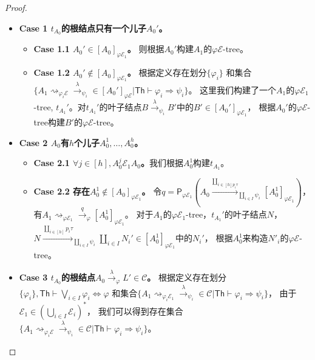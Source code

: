 \begin{proof}
\begin{itemize}
   \item {
      \textbf{Case 1 $t_{A_0}$的根结点只有一个儿子$A_0'$。}
      \begin{itemize}
         \item {
            \textbf{Case 1.1 $A_0'\in [A_0]_{\varphi\mathcal{E}_1}$。} 则根据$A_0'$构建$A_1$的$\varphi\mathcal{E}$-tree。
         }
         \item {
            \textbf{Case 1.2 $A_0'\notin [A_0]_{\varphi\mathcal{E}_1}$。} 
            根据定义存在划分$\{\varphi_i\}$
            和集合$\{A_1\rightsquigarrow_{\varphi_i\mathcal{E}}\stackrel{\lambda}{\rightarrow}_{\psi_i} \in [A_0']_{\varphi\mathcal{E}}|\mathsf{Th}\vdash \varphi_i\Rightarrow\psi_i\}$。
            这里我们构建了一个$A_1$的$\varphi\mathcal{E}_1$-tree, $t_{A_1}'$。对$t_{A_1}'$的叶子结点$B\stackrel{\lambda}{\rightarrow}_{\psi_i} B'$中的$B'\in[A_0']_{\varphi\mathcal{E}_1}$，
            根据$A_0'$的$\varphi\mathcal{E}$-tree构建$B'$的$\varphi\mathcal{E}$-tree。
         }
      \end{itemize}
   }
   \item {
      \textbf{Case 2 $A_0$有$h$个儿子$A_0^1,\dots, A_0^h$。}
      \begin{itemize}
         \item {
            \textbf{Case 2.1 $\forall j\in [h], A^j_0\mathcal{E}_1 A_0$。}我们根据$A^1_0$构建$t_{A_1}$。
         }
         \item {
            \textbf{Case 2.2 存在$A^1_0\notin[A_0]_{\varphi\mathcal{E}_1}$。}
            令$q = \mathsf{P}_{\varphi\mathcal{E}_1}(A_0\stackrel{\coprod_{i\in [h]p_i\tau}}{\rightarrow}_{\coprod_{i\in I}\psi_i}[A^1_0]_{\varphi\mathcal{E}_1})$，
            有$A_1\rightsquigarrow_{\varphi \mathcal{E}_1}\stackrel{q}{\rightarrow}_{\varphi} [A^1_0]_{\varphi\mathcal{E}_1}$。
            对于$A_1$的$\varphi\mathcal{E}_1$-tree，$t_{A_1}'$的叶子结点$N$，$N\stackrel{\coprod_{i\in [h]}p_i\tau}{\rightarrow}_{\coprod_{i\in I}\psi_i} \coprod_{i\in I}N_i'\in [A^1_0]_{\varphi\mathcal{E}_1}$中的$N_i'$，
            根据$A^1_0$来构造$N'_i$的$\varphi\mathcal{E}$-tree。
         }
      \end{itemize}
   }
   \item {
      \textbf{Case 3 $t_{A_0}$的根结点$A_0\stackrel{\lambda}{\rightarrow}_{\varphi} L'\in \mathcal{C}$。}
      根据定义存在划分$\{\varphi_i\}, \mathsf{Th}\vdash\bigvee_{i\in I}\varphi_i \Leftrightarrow \varphi$
      和集合$\{A_1\rightsquigarrow_{\varphi_i\mathcal{E}_1}\stackrel{\lambda}{\rightarrow}_{\psi_i} \in \mathcal{C}|\mathsf{Th}\vdash \varphi_i\Rightarrow\psi_i\}$，
      由于$\mathcal{E}_1\in (\bigcup_{i\in I}\mathcal{E}_i)^*$， 我们可以得到存在集合$\{A_1\rightsquigarrow_{\varphi_i\mathcal{E}}\stackrel{\lambda}{\rightarrow}_{\psi_i} \in \mathcal{C}|\mathsf{Th}\vdash \varphi_i\Rightarrow\psi_i\}$。
   }
\end{itemize}
\end{proof}

